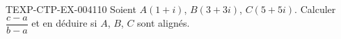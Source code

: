 \begin{exercice}{TEXP-CTP-EX-004}{1}{10}
Soient $A(1+i)$, $B(3+3i)$, $C(5+5i)$. Calculer $\dfrac{c-a}{b-a}$ et en déduire si $A$, $B$, $C$ sont alignés.
\end{exercice}
